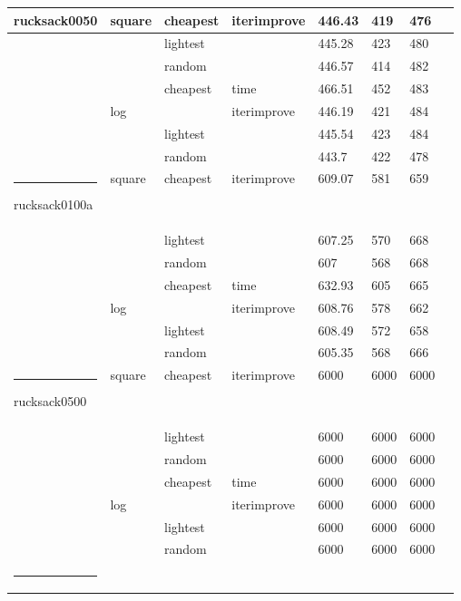 \documentclass[11pt,a4paper]{article}
\makeatletter
\def\hlinewd#1{
  \noalign{\ifnum0=`}\fi\hrule \@height #1 \futurelet
  \reserved@a\@xhline
}
\makeatother
\begin{document}
\begin{table}[!t]
\begin{tabular}{ | l | l | l | l | l | l | l | l | }
        rucksack0050 & square & cheapest & iterimprove & 446.43 & 419 & \textcolor{BrickRed}{476} \\ \hline
        &            & lightest & & 445.28 & 423 & 480 \\ \hline
        &            & random & & 446.57 & 414 & 482 \\ \hline
        &            & cheapest & time & \textcolor{OliveGreen}{466.51} & 452 & 483 \\ \hline
        & log        & & iterimprove & 446.19 & 421 & \textcolor{OliveGreen}{484} \\ \hline
        &            & lightest & & 445.54 & 423 & \textcolor{OliveGreen}{484} \\ \hline
        &            & random & & \textcolor{BrickRed}{443.7} & 422 & 478 \\ \hlinewd{3pt}
        rucksack0100a & square & cheapest & iterimprove & 609.07 & 581 & 659 \\ \hline
        &             & lightest & & 607.25 & 570 & \textcolor{OliveGreen}{668} \\ \hline
        &             & random & & 607 & 568 & \textcolor{OliveGreen}{668} \\ \hline
        &             & cheapest & time & \textcolor{OliveGreen}{632.93} & 605 & 665 \\ \hline
        & log         & & iterimprove & 608.76 & 578 & 662 \\ \hline
        &             & lightest & & 608.49 & 572 & \textcolor{BrickRed}{658} \\ \hline
        &             & random & & \textcolor{BrickRed}{605.35} & 568 & 666 \\ \hlinewd{3pt}
        rucksack0500 & square & cheapest & iterimprove & 6000 & 6000 & 6000 \\ \hline
        &            & lightest & & 6000 & 6000 & 6000 \\ \hline
        &            & random & & 6000 & 6000 & 6000 \\ \hline
        &            & cheapest & time & 6000 & 6000 & 6000 \\ \hline
        & log        & & iterimprove & 6000 & 6000 & 6000 \\ \hline
        &            & lightest & & 6000 & 6000 & 6000 \\ \hline
        &            & random & & 6000 & 6000 & 6000 \\ \hlinewd{3pt}

\end{tabular}
\end{table}
\end{document}
